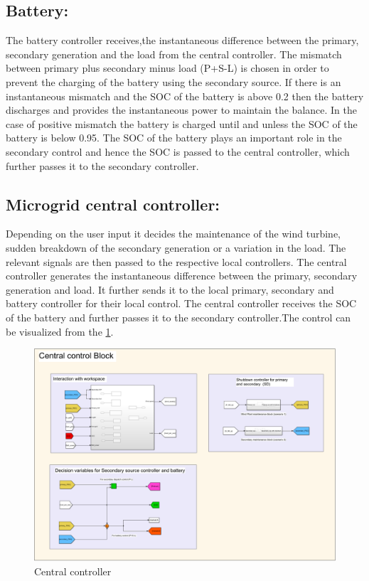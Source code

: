 \subsection{Battery:}
The battery controller receives,the instantaneous difference between the primary, secondary generation and the load from the central controller. The mismatch between primary plus secondary minus load (P+S-L) is chosen in order to prevent the charging of the battery using the secondary source. If there is an instantaneous mismatch and the SOC of the battery is above 0.2 then the battery discharges and provides the instantaneous power to maintain the balance.
In the case of positive mismatch the battery is charged until and unless the SOC of the battery is below 0.95.
The SOC of the battery plays an important role in the secondary control and hence the SOC is passed to the central controller, which further passes it to the secondary controller.

\subsection{Microgrid central controller:}
Depending on the user input it decides the maintenance of the wind turbine, sudden breakdown of the secondary generation or a variation in the load. The relevant signals are then passed to the respective local controllers.
The central controller generates the instantaneous difference between the primary, secondary generation and load. It further sends it to the local primary, secondary and battery controller for their local control. The central controller receives the SOC of the battery and further passes it to the secondary controller.The control can be visualized from the \ref{fig:central_control}.
\begin{figure}[H]
    \centering
    \includegraphics[width = 0.8 \linewidth]{Final_report/Images/central_controller.PNG}
    \caption{Central controller}
    \label{fig:central_control}
\end{figure}

